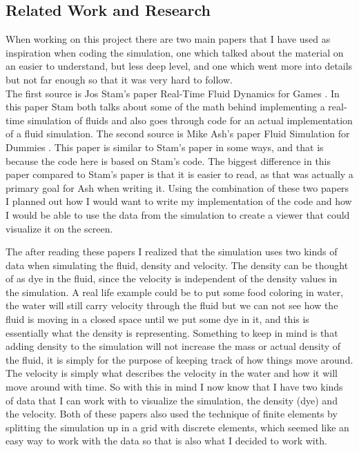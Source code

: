 \documentclass{article}
\begin{document}
\begin{multicols}{2}
\section{Related Work and Research}
When working on this project there are two main papers that I have used as inspiration when coding the simulation, one which talked about the material on an easier to understand, but less deep level, and one which went more into details but not far enough so that it was very hard to follow.\\
The first source is Jos Stam's paper Real-Time Fluid Dynamics for Games \cite{stam}. In this paper Stam both talks about some of the math behind implementing a real-time simulation of fluids and also goes through code for an actual implementation of a fluid simulation. The second source is Mike Ash's paper Fluid Simulation for Dummies \cite{ash}. This paper is similar to Stam's paper in some ways, and that is because the code here is based on Stam's code. The biggest difference in this paper compared to Stam's paper is that it is easier to read, as that was actually a primary goal for Ash when writing it. Using the combination of these two papers I planned out how I would want to write my implementation of the code and how I would be able to use the data from the simulation to create a viewer that could visualize it on the screen.

The after reading these papers I realized that the simulation uses two kinds of data when simulating the fluid, density and velocity. The density can be thought of as dye in the fluid, since the velocity is independent of the density values in the simulation. A real life example could be to put some food coloring in water, the water will still carry velocity through the fluid but we can not see how the fluid is moving in a closed space until we put some dye in it, and this is essentially what the density is representing. Something to keep in mind is that adding density to the simulation will not increase the mass or actual density of the fluid, it is simply for the purpose of keeping track of how things move around. The velocity is simply what describes the velocity in the water and how it will move around with time. So with this in mind I now know that I have two kinds of data that I can work with to visualize the simulation, the density (dye) and the velocity. Both of these papers also used the technique of finite elements by splitting the simulation up in a grid with discrete elements, which seemed like an easy way to work with the data so that is also what I decided to work with.


\end{multicols}
\end{document}
